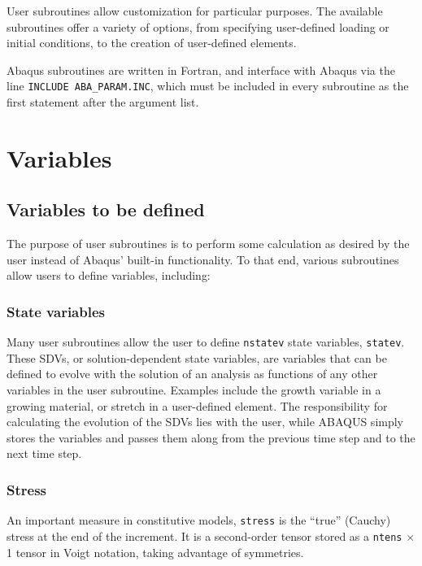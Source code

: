 \documentclass[10pt,letterpaper,oneside]{report}
\begin{document}
User subroutines allow customization for particular purposes.  The available subroutines offer a variety of options, from specifying user-defined loading or initial conditions, to the creation of user-defined elements.  

Abaqus subroutines are written in Fortran, and interface with Abaqus via the line \texttt{INCLUDE ABA\_PARAM.INC}, which must be included in every subroutine as the first statement after the argument list.

\section{Variables}

\subsection{Variables to be defined}
The purpose of user subroutines is to perform some calculation as desired by the user instead of Abaqus' built-in functionality.  To that end, various subroutines allow users to define variables, including: 

\subsubsection{State variables}
Many user subroutines allow the user to define \texttt{nstatev} state variables, \texttt{statev}.  These SDVs, or solution-dependent state variables, are variables that can be defined to evolve with the solution of an analysis as functions of any other variables in the user subroutine.  Examples include the growth variable in a growing material, or stretch in a user-defined element.  The responsibility for calculating the evolution of the SDVs lies with the user, while ABAQUS simply stores the variables and passes them along from the previous time step and to the next time step.  

\subsubsection{Stress}
An important measure in constitutive models, \texttt{stress} is the “true” (Cauchy) stress at the end of the increment.  It is a second-order tensor stored as a \texttt{ntens} $\times$ 1 tensor in Voigt notation, taking advantage of symmetries.
\end{document}
